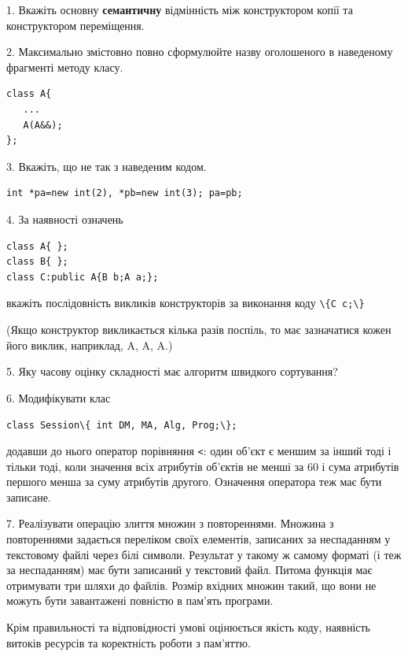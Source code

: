 \documentclass[12pt, ukrainian]{article}
\def\code#1{\Verb!#1!}
\begin{document}
{%
1. Вкажіть основну \textbf{семантичну} відмінність між конструктором копії та конструктором переміщення.%
\par
\vspace{2mm}
2. Максимально змістовно повно сформулюйте назву оголошеного в наведеному фрагменті методу класу.
\vspace{-3mm}
\begin{verbatim}class A{
   ...
   A(A&&);
};\end{verbatim}
\vspace{-3mm}
\par
\vspace{2mm}
3. Вкажіть, що не так з наведеним кодом.
\vspace{-3mm}
\begin{verbatim}int *pa=new int(2), *pb=new int(3); pa=pb;\end{verbatim}
\vspace{-3mm}
\par
\vspace{2mm}
4. За наявності означень
\vspace{-3mm}
\begin{verbatim}
class A{ };
class B{ };
class C:public A{B b;A a;};\end{verbatim}
\vspace{-3mm}
вкажіть послідовність викликів конструкторів за виконання коду \code{\{C c;\}} 

(Якщо конструктор викликається кілька разів поспіль, то має зазначатися кожен його виклик, наприклад, A, A, A.)

\vspace{2mm}
5. Яку часову оцінку складності має алгоритм швидкого сортування?
\par
\vspace{2mm}
6. Модифікувати клас 

\qquad\code{class Session\{ int DM, MA, Alg, Prog;\};} 


додавши до нього оператор порівняння \code{<}: один об'єкт є меншим за інший тоді і тільки тоді, коли значення всіх атрибутів об'єктів не менші за 60 і сума атрибутів першого менша за суму атрибутів другого. Означення оператора теж має бути записане.%
\par
\vspace{2mm}
7. 
Реалізувати операцію злиття множин з повтореннями. Множина з повтореннями задається переліком своїх елементів, записаних за неспаданням у текстовому файлі через білі символи. Результат у такому ж самому форматі (і теж за неспаданням) має бути записаний у текстовий файл. Питома функція має отримувати три шляхи до файлів. Розмір вхідних множин такий, що вони не можуть бути завантажені повністю в пам’ять програми.

Крім правильності та відповідності умові оцінюється якість коду, наявність витоків ресурсів та коректність роботи з пам'яттю. 

}
\end{document}
